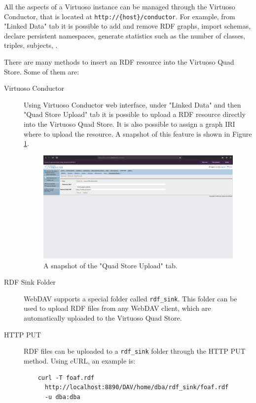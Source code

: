 All the aspects of a Virtuoso instance can be managed through the Virtuoso Conductor, that is located at \verb#http://{host}/conductor#. For example, from "Linked Data" tab it is possible to add and remove \ac{RDF} graphs, import schemas, declare persistent namespaces, generate statistics such as the number of classes, triples, subjects, \etc.

There are many methods to insert an \ac{RDF} resource into the Virtuoso Quad Store. Some of them are:

\begin{description}
  \item[Virtuoso Conductor] Using Virtuoso Conductor web interface, under "Linked Data" and then "Quad Store Upload" tab it is possible to upload a \ac{RDF} resource directly into the Virtuoso Quad Store. It is also possible to assign a graph \ac{IRI} where to upload the resource. A snapshot of this feature is shown in Figure \ref{fig:virtuoso-upload}.
  \begin{figure}[!ht]
    \centering
    \includegraphics[width=\columnwidth]{images/virtuoso/virtuoso-upload}
    \caption{A snapshot of the "Quad Store Upload" tab.}
    \label{fig:virtuoso-upload}
  \end{figure}

  \item[RDF Sink Folder] WebDAV supports a special folder called \verb#rdf_sink#. This folder can be used to upload \ac{RDF} files from any WebDAV client, which are automatically uploaded to the Virtuoso Quad Store.

  \item[\ac{HTTP} PUT] \ac{RDF} files can be uploaded to a \verb#rdf_sink# folder through the \ac{HTTP} PUT method. Using cURL, an example is:
  \begin{verbatim}
    curl -T foaf.rdf
      http://localhost:8890/DAV/home/dba/rdf_sink/foaf.rdf
      -u dba:dba
  \end{verbatim}


\end{description}
